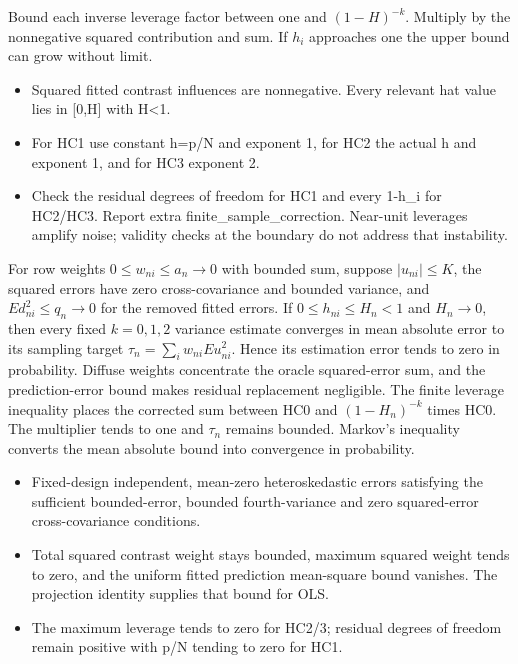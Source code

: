 \expandafter\def\csname statadic@proof@STATADIC-HC-003\endcsname{Bound each inverse leverage factor between one and
  $(1-H)^{-k}$. Multiply by the nonnegative squared contribution and sum.
  If $h_i$ approaches one the upper bound can grow without limit.}
\expandafter\def\csname statadic@assumptions@STATADIC-HC-003\endcsname{\begin{itemize}
\item Squared fitted contrast influences are nonnegative. Every relevant hat value lies in [0,H] with H<1.
\item For HC1 use constant h=p/N and exponent 1, for HC2 the actual h and exponent 1, and for HC3 exponent 2.
\end{itemize}}
\expandafter\def\csname statadic@diagnostics@STATADIC-HC-003\endcsname{\begin{itemize}
\item Check the residual degrees of freedom for HC1 and every 1-h\_i for HC2/HC3. Report extra finite\_sample\_correction. Near-unit leverages amplify noise; validity checks at the boundary do not address that instability.
\end{itemize}}
\expandafter\def\csname statadic@statement@STATADIC-HC-004\endcsname{For row weights $0\le w_{ni}\le a_n\to0$ with bounded
  sum, suppose $|u_{ni}|\le K$, the squared errors have zero cross-covariance
  and bounded variance, and $E d_{ni}^2\le q_n\to0$ for the removed
  fitted errors. If $0\le h_{ni}\le H_n<1$ and $H_n\to0$, then every
  fixed $k=0,1,2$ variance estimate converges in mean absolute error to
  its sampling target $\tau_n=\sum_i w_{ni}E u_{ni}^2$.
  Hence its estimation error tends to zero in probability.}
\expandafter\def\csname statadic@proof@STATADIC-HC-004\endcsname{Diffuse weights concentrate the oracle squared-error sum,
  and the prediction-error bound makes residual replacement negligible.
  The finite leverage inequality places the corrected sum between HC0 and
  $(1-H_n)^{-k}$ times HC0. The multiplier tends to one and $\tau_n$
  remains bounded. Markov's inequality converts the mean absolute bound
  into convergence in probability.}
\expandafter\def\csname statadic@assumptions@STATADIC-HC-004\endcsname{\begin{itemize}
\item Fixed-design independent, mean-zero heteroskedastic errors satisfying the sufficient bounded-error, bounded fourth-variance and zero squared-error cross-covariance conditions.
\item Total squared contrast weight stays bounded, maximum squared weight tends to zero, and the uniform fitted prediction mean-square bound vanishes. The projection identity supplies that bound for OLS.
\item The maximum leverage tends to zero for HC2/3; residual degrees of freedom remain positive with p/N tending to zero for HC1.
\end{itemize}}
